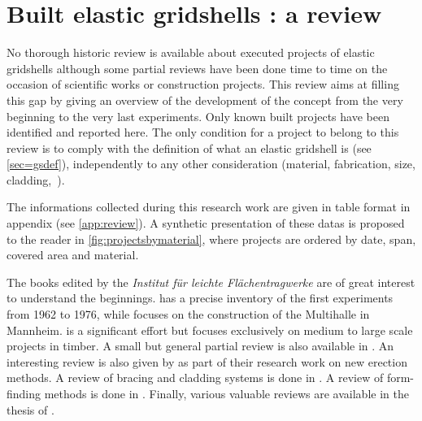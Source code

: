 \section{Built elastic gridshells : a review}\label{sec=review_project}

No thorough historic review is available about executed projects of elastic gridshells although some partial reviews have been done time to time on the occasion of scientific works or construction projects. This review aims at filling this gap by giving an overview of the development of the concept from the very beginning to the very last experiments. Only known built projects have been identified and reported here. The only condition for a project to belong to this review is to comply with the definition of what an elastic gridshell is (see \cref{sec=gsdef}), independently to any other consideration (material, fabrication, size, cladding,~\telp{}).

The informations collected during this research work are given in table format in appendix (see \cref{app:review}). A synthetic presentation of these datas is proposed to the reader in \cref{fig:projectsbymaterial}, where projects are ordered by date, span, covered area and material.

The books edited by the \emph{Institut für leichte Flächentragwerke} are of great interest to understand the beginnings.  \cite{IL10} has a precise inventory of the first experiments from 1962 to 1976, while  \cite{IL13} focuses on the construction of the Multihalle in Mannheim.  \cite{Chilton2017} is a significant effort but focuses exclusively on medium to large scale projects in timber. A small but general partial review is also available in \cite{Collins2016}. An interesting review is also given by \citet{Quinn2014} as part of their research work on new erection methods. A review of bracing and cladding systems is done in \cite{Cuvilliers2017}. A review of form-finding methods is done in \cite{Vaulot2016}. Finally, various valuable reviews are available in the thesis of \citet{Douthe2007,Bouhaya2010,Tayeb2015a,Lafuente2015}.


